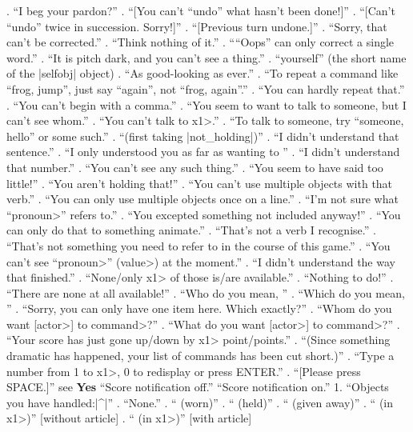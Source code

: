 . ``I beg your pardon?''
. ``[You can't ``undo'' what hasn't been done!]''
. ``[Can't ``undo'' twice in succession. Sorry!]''
. ``[Previous turn undone.]''
. ``Sorry, that can't be corrected.''
. ``Think nothing of it.''
. ````Oops'' can only correct a single word.''
. ``It is pitch dark, and you can't see a thing.''
. ``yourself'' (the short name of the |selfobj| object)
. ``As good-looking as ever.''
. ``To repeat a command like ``frog, jump'', just say
``again'', not ``frog, again''.''
. ``You can hardly repeat that.''
. ``You can't begin with a comma.''
. ``You seem to want to talk to someone, but I can't see whom.''
. ``You can't talk to \<x1>.''
. ``To talk to someone, try ``someone, hello'' or some such.''
. ``(first taking |not_holding|)''
. ``I didn't understand that sentence.''
. ``I only understood you as far as wanting to ''
. ``I didn't understand that number.''
. ``You can't see any such thing.''
. ``You seem to have said too little!''
. ``You aren't holding that!''
. ``You can't use multiple objects with that verb.''
. ``You can only use multiple objects once on a line.''
. ``I'm not sure what ``\<pronoun>'' refers to.''
. ``You excepted something not included anyway!''
. ``You can only do that to something animate.''
. ``That's not a verb I recognise.''
. ``That's not something you need to refer to in the
course of this game.''
. ``You can't see ``\<pronoun>'' (\<value>) at the moment.''
. ``I didn't understand the way that finished.''
. ``None/only \<x1> of those is/are available.''
. ``Nothing to do!''
. ``There are none at all available!''
. ``Who do you mean, ''
. ``Which do you mean, ''
. ``Sorry, you can only have one item here. Which exactly?''
. ``Whom do you want [\<actor>] to \<command>?''
. ``What do you want [\<actor>] to \<command>?''
. ``Your score has just gone up/down by \<x1> point/points.''
. ``(Since something dramatic has happened, your list of
commands has been cut short.)''
. ``Type a number from 1 to \<x1>, 0 to redisplay or press ENTER.''
. ``[Please press SPACE.]''
    see {\bf Yes}
 ``Score notification off.''
 ``Score notification on.''
 1. ``Objects you have handled:|^|''
. ``None.''
. ``   (worn)''
. ``   (held)''
. ``   (given away)''
. ``   (in \<x1>)'' [without article]
. ``   (in \<x1>)'' [with article]
